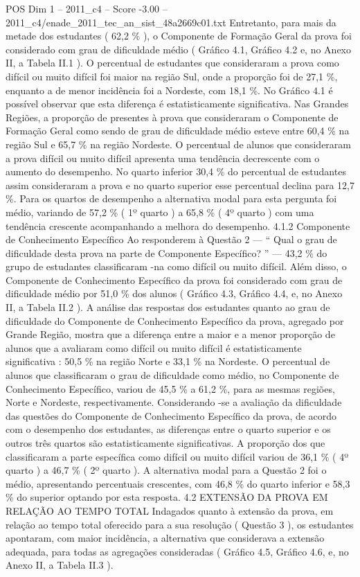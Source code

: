 \begin{textsample}{POS Dim 1 – 2011\_c4 – Score -3.00 – 2011\_c4/enade\_2011\_tec\_an\_sist\_48a2669c01.txt}
Entretanto, para mais da metade dos estudantes ( 62,2 \% ), o Componente de Formação Geral da prova foi considerado com grau de dificuldade médio ( Gráfico 4.1, Gráfico 4.2 e, no Anexo II, a Tabela II.1 ).
O percentual de estudantes que consideraram a prova como difícil ou muito difícil foi maior na região Sul, onde a proporção foi de 27,1 \%, enquanto a de menor incidência foi a Nordeste, com 18,1 \%.
No Gráfico 4.1 é possível observar que esta diferença é estatisticamente significativa.
Nas Grandes Regiões, a proporção de presentes à prova que consideraram o Componente de Formação Geral como sendo de grau de dificuldade médio esteve entre 60,4 \% na região Sul e 65,7 \% na região Nordeste.
O percentual de alunos que consideraram a prova difícil ou muito difícil apresenta uma tendência decrescente com o aumento do desempenho.
No quarto inferior 30,4 \% do percentual de estudantes assim consideraram a prova e no quarto superior esse percentual declina para 12,7 \%.
Para os quartos de desempenho a alternativa modal para esta pergunta foi médio, variando de 57,2 \% ( 1º quarto ) a 65,8 \% ( 4º quarto ) com uma tendência crescente acompanhando a melhora do desempenho. 4.1.2 Componente de Conhecimento Específico Ao responderem à Questão 2 — “ Qual o grau de dificuldade desta prova na parte de Componente Específico? ” — 43,2 \% do grupo de estudantes classificaram -na como difícil ou muito difícil.
Além disso, o Componente de Conhecimento Específico da prova foi considerado com grau de dificuldade médio por 51,0 \% dos alunos ( Gráfico 4.3, Gráfico 4.4, e, no Anexo II, a Tabela II.2 ).
A análise das respostas dos estudantes quanto ao grau de dificuldade do Componente de Conhecimento Específico da prova, agregado por Grande Região, mostra que a diferença entre a maior e a menor proporção de alunos que a avaliaram como difícil ou muito difícil é estatisticamente significativa : 50,5 \% na região Norte e 33,1 \% na Nordeste.
O percentual de alunos que classificaram o grau de dificuldade como médio, no Componente de Conhecimento Específico, variou de 45,5 \% a 61,2 \%, para as mesmas regiões, Norte e Nordeste, respectivamente.
Considerando -se a avaliação da dificuldade das questões do Componente de Conhecimento Específico da prova, de acordo com o desempenho dos estudantes, as diferenças entre o quarto superior e os outros três quartos são estatisticamente significativas.
A proporção dos que classificaram a parte específica como difícil ou muito difícil variou de 36,1 \% ( 4º quarto ) a 46,7 \% ( 2º quarto ).
A alternativa modal para a Questão 2 foi o médio, apresentando percentuais crescentes, com 46,8 \% do quarto inferior e 58,3 \% do superior optando por esta resposta. 4.2 EXTENSÃO DA PROVA EM RELAÇÃO AO TEMPO TOTAL Indagados quanto à extensão da prova, em relação ao tempo total oferecido para a sua resolução ( Questão 3 ), os estudantes apontaram, com maior incidência, a alternativa que considerava a extensão adequada, para todas as agregações consideradas ( Gráfico 4.5, Gráfico 4.6, e, no Anexo II, a Tabela II.3 ).

\end{textsample}
